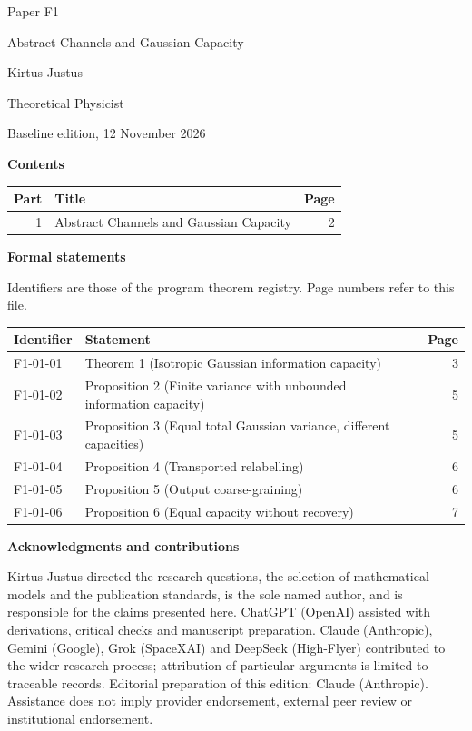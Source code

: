 \documentclass[11pt,a4paper]{article}
\begin{document}
\thispagestyle{empty}\pagestyle{empty}
{\small\sffamily \ProgramTitle\hfill Paper F1\par}
\vspace*{12mm}
{\LARGE\bfseries\raggedright{} Abstract Channels and Gaussian Capacity\par}
\vspace{9mm}
{\large Kirtus Justus\par}\vspace{1mm}Theoretical Physicist\par\AuthorLocation\par\vspace{2mm}Baseline edition, 12 November 2026\par\vspace{8mm}
\textbf{Contents}\par\vspace{1mm}
{\small\begin{longtable}{@{}r>{\raggedright\arraybackslash}p{}r@{}}
\toprule Part & Title & Page\\\midrule\endhead
1 & Abstract Channels and Gaussian Capacity & 2\\
\bottomrule\end{longtable}}
\vspace{2mm}\textbf{Formal statements}\par\vspace{1mm}
{\footnotesize Identifiers are those of the program theorem registry. Page numbers refer to this file.\par}
{\footnotesize\begin{longtable}{@{}l>{\raggedright\arraybackslash}p{}r@{}}
\toprule Identifier & Statement & Page\\\midrule\endhead
F1-01-01 & Theorem 1 (Isotropic Gaussian information capacity) & 3\\
F1-01-02 & Proposition 2 (Finite variance with unbounded information capacity) & 5\\
F1-01-03 & Proposition 3 (Equal total Gaussian variance, different capacities) & 5\\
F1-01-04 & Proposition 4 (Transported relabelling) & 6\\
F1-01-05 & Proposition 5 (Output coarse-graining) & 6\\
F1-01-06 & Proposition 6 (Equal capacity without recovery) & 7\\
\bottomrule\end{longtable}}
\vspace{3mm}\textbf{Acknowledgments and contributions}\par
{\small Kirtus Justus directed the research questions, the selection of mathematical models and the publication standards, is the sole named author, and is responsible for the claims presented here. ChatGPT (OpenAI) assisted with derivations, critical checks and manuscript preparation. Claude (Anthropic), Gemini (Google), Grok (SpaceXAI) and DeepSeek (High-Flyer) contributed to the wider research process; attribution of particular arguments is limited to traceable records. Editorial preparation of this edition: Claude (Anthropic). Assistance does not imply provider endorsement, external peer review or institutional endorsement.\par}
\end{document}
